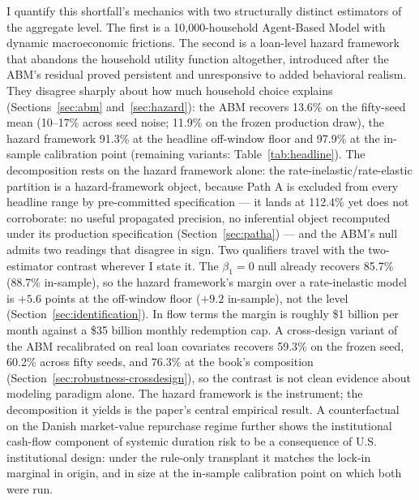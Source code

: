 \documentclass[12pt]{article}
\begin{document}
I quantify this shortfall's mechanics with two structurally distinct estimators of the aggregate level. The first is a 10,000-household Agent-Based Model with dynamic macroeconomic frictions. The second is a loan-level hazard framework that abandons the household utility function altogether, introduced after the ABM's residual proved persistent and unresponsive to added behavioral realism. They disagree sharply about how much household choice explains (Sections~\ref{sec:abm} and~\ref{sec:hazard}): the ABM recovers 13.6\% on the fifty-seed mean (10--17\% across seed noise; 11.9\% on the frozen production draw), the hazard framework 91.3\% at the headline off-window floor and 97.9\% at the in-sample calibration point (remaining variants: Table~\ref{tab:headline}). The decomposition rests on the hazard framework alone: the rate-inelastic/rate-elastic partition is a hazard-framework object, because Path A is excluded from every headline range by pre-committed specification --- it lands at 112.4\% yet does not corroborate: no useful propagated precision, no inferential object recomputed under its production specification (Section~\ref{sec:patha}) --- and the ABM's null admits two readings that disagree in sign. Two qualifiers travel with the two-estimator contrast wherever I state it. The $\beta_1 = 0$ null already recovers 85.7\% (88.7\% in-sample), so the hazard framework's margin over a rate-inelastic model is $+5.6$ points at the off-window floor ($+9.2$ in-sample), not the level (Section~\ref{sec:identification}). In flow terms the margin is roughly \$1 billion per month against a \$35 billion monthly redemption cap. A cross-design variant of the ABM recalibrated on real loan covariates recovers 59.3\% on the frozen seed, 60.2\% across fifty seeds, and 76.3\% at the book's composition (Section~\ref{sec:robustness-crossdesign}), so the contrast is not clean evidence about modeling paradigm alone. The hazard framework is the instrument; the decomposition it yields is the paper's central empirical result. A counterfactual on the Danish market-value repurchase regime further shows the institutional cash-flow component of systemic duration risk to be a consequence of U.S. institutional design: under the rule-only transplant it matches the lock-in marginal in origin, and in size at the in-sample calibration point on which both were run.
\end{document}
